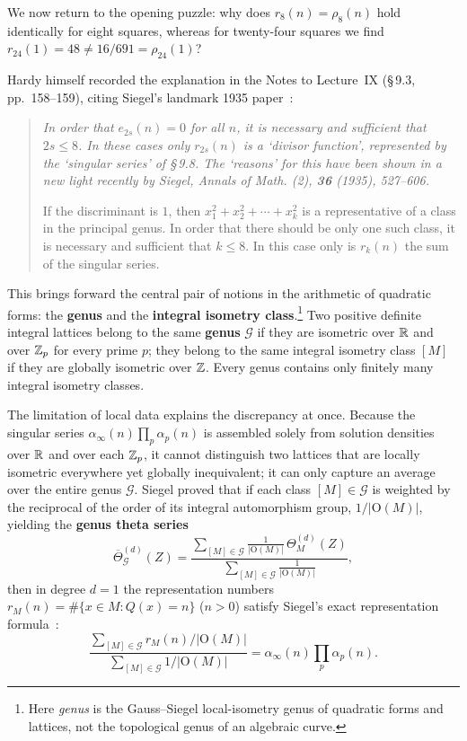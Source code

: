 We now return to the opening puzzle: why does $r_8(n)=\rho_8(n)$ hold identically for eight squares, whereas for twenty-four squares we find $r_{24}(1)=48\ne 16/691=\rho_{24}(1)$?

Hardy himself recorded the explanation in the Notes to Lecture~IX (\S\,9.3, pp.~158--159), citing Siegel's landmark 1935 paper~\cite{Siegel1935,Hardy1940}:
\begin{quote}
\itshape
In order that $e_{2s}(n)=0$ for all $n$, it is necessary and sufficient that $2s\le 8$. In these cases only $r_{2s}(n)$ is a `divisor function', represented by the `singular series' of \S\,9.8. The `reasons' for this have been shown in a new light recently by Siegel, \textup{Annals of Math.} (2), \textbf{36} (1935), 527--606.

If the discriminant is $1$, then $x_1^2+x_2^2+\cdots+x_k^2$ is a representative of a class in the principal genus. In order that there should be only one such class, it is necessary and sufficient that $k\le 8$. In this case only is $r_k(n)$ the sum of the singular series.
\end{quote}

This brings forward the central pair of notions in the arithmetic of quadratic forms: the \textbf{genus} and the \textbf{integral isometry class}.\footnote{Here \emph{genus} is the Gauss--Siegel local-isometry genus of quadratic forms and lattices, not the topological genus of an algebraic curve.} Two positive definite integral lattices belong to the same \textbf{genus} $\mathcal G$ if they are isometric over $\mathbb{R}$ and over $\mathbb{Z}_p$ for every prime $p$; they belong to the same integral isometry class $[M]$ if they are globally isometric over $\mathbb{Z}$. Every genus contains only finitely many integral isometry classes.

The limitation of local data explains the discrepancy at once. Because the singular series $\alpha_\infty(n)\prod_p\alpha_p(n)$ is assembled solely from solution densities over $\mathbb{R}$ and over each $\mathbb{Z}_p$, it cannot distinguish two lattices that are locally isometric everywhere yet globally inequivalent; it can only capture an average over the entire genus $\mathcal G$. Siegel proved that if each class $[M]\in\mathcal G$ is weighted by the reciprocal of the order of its integral automorphism group, $1/|\mathrm O(M)|$, yielding the \textbf{genus theta series}~\cite[(2.1.3.1)]{Li2023}
\[
\overline{\Theta}_{\mathcal G}^{(d)}(Z)
=\frac{\displaystyle\sum_{[M]\in\mathcal G}\frac{1}{|\mathrm O(M)|}\,\Theta_M^{(d)}(Z)}
      {\displaystyle\sum_{[M]\in\mathcal G}\frac{1}{|\mathrm O(M)|}},
\]
then in degree $d=1$ the representation numbers $r_M(n)=\#\{x\in M:Q(x)=n\}$ ($n>0$) satisfy Siegel's exact representation formula~\cite{Siegel1935,Li2023}:
\[
\frac{\displaystyle\sum_{[M]\in\mathcal G} r_M(n)/|\mathrm O(M)|}
     {\displaystyle\sum_{[M]\in\mathcal G} 1/|\mathrm O(M)|}
=\alpha_\infty(n)\prod_p\alpha_p(n).
\]

